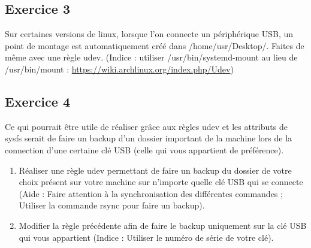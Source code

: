 \documentclass[11pt]{article}
\begin{document}
\subsection*{Exercice 3}

Sur certaines versions de linux, lorsque l'on connecte un périphérique USB, un point de montage 
est automatiquement créé dans /home/usr/Desktop/. Faites de même avec une règle udev. 
(Indice : utiliser /usr/bin/systemd-mount au lieu de /usr/bin/mount : \url{https://wiki.archlinux.org/index.php/Udev})

\subsection*{Exercice 4}

Ce qui pourrait être utile de réaliser grâce aux règles udev et les attributs de sysfs serait de faire un backup d'un dossier important de la machine lors de la connection d'une certaine clé USB (celle qui vous appartient de préférence). 

\begin{enumerate}
	\item Réaliser une règle udev permettant de faire un backup du dossier de votre choix présent sur votre machine sur n'importe quelle clé USB qui se connecte (Aide : Faire attention à la synchronisation des différentes commandes ; Utiliser la commande rsync pour faire un backup).

	\item Modifier la règle précédente afin de faire le backup uniquement sur la clé USB qui vous appartient (Indice : Utiliser le numéro de série de votre clé).		
	
\end{enumerate}
\end{document}
